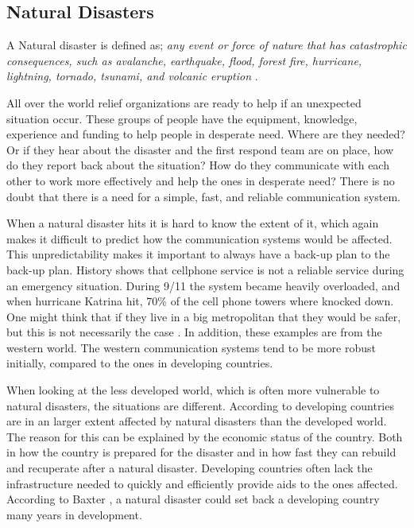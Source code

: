 \subsection{Natural Disasters}
A Natural disaster is defined as; \textit{any event or force of nature that has catastrophic consequences, such as avalanche, earthquake, flood, forest fire, hurricane, lightning, tornado, tsunami, and volcanic eruption} \cite{naturalDisaster}.

All over the world relief organizations are ready to help if an unexpected situation occur. These groups of people have the equipment, knowledge, experience and funding to help people in desperate need. Where are they needed? Or if they hear about the disaster and the first respond team are on place, how do they report back about the situation? How do they communicate with each other to work more effectively and help the ones in desperate need? There is no doubt that there is a need for a simple, fast, and reliable communication system.

When a natural disaster hits it is hard to know the extent of it, which  again makes it difficult to predict how the communication systems would be affected. This unpredictability makes it important to always have a back-up plan to the back-up plan. History shows that cellphone service is not a reliable service during an emergency situation. During 9/11 the system became heavily overloaded, and when hurricane Katrina hit, 70\% of the cell phone towers where knocked down. One might think that if they live in a big metropolitan that they would be safer, but this is not necessarily the case \cite{disasterComm}. In addition, these examples are from the western world. The western communication systems tend to be more robust initially, compared to the ones in developing countries. 

When looking at the less developed world, which is often more vulnerable to natural disasters, the situations are different. According to \cite{DevelopingWorld, 360} developing countries are in an larger extent affected by natural disasters than the developed world. The reason for this can be explained by the economic status of the country. Both in how the country is prepared for the disaster and in how fast they can rebuild and recuperate after a natural disaster. Developing countries often lack the infrastructure needed to quickly and efficiently provide aids to the ones affected. According to Baxter \cite{360}, a natural disaster could set back a developing country many years in development.  

